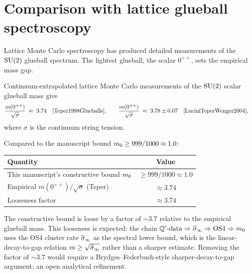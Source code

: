\section{Comparison with lattice glueball spectroscopy}
\label{sec:teper-comparison}

%

Lattice Monte Carlo spectroscopy has produced detailed measurements
of the $\SUtwo$ glueball spectrum.  The lightest glueball, the
scalar $0^{++}$, sets the empirical mass gap.

\begin{theorem}
\label{thm:teper-ratio}
Continuum-extrapolated lattice Monte Carlo measurements of the
$\SUtwo$ scalar glueball mass give
\begin{equation}
  \label{eq:teper-ratio}
  \frac{m(0^{++})}{\sqrt{\sigma}} \;\approx\; 3.74
  \quad \text{\cite{Teper1998Glueballs}},
  \qquad
  \frac{m(0^{++})}{\sqrt{\sigma}} \;\approx\; 3.78 \pm 0.07
  \quad \text{\cite{LuciniTeperWenger2004}} ,
\end{equation}
where $\sigma$ is the continuum string tension.
\end{theorem}

Compared to the manuscript bound $m_0 \ge 999/1000 \approx 1.0$:

\begin{infobox}[main][title=Bound versus empirical $\SUtwo$ mass]
\centering
\renewcommand{\arraystretch}{1.25}
\begin{tabular}{lc}
\toprule
Quantity                                         & Value     \\
\midrule
This manuscript's constructive bound $m_0$  & $\ge 999/1000 \approx 1.0$ \\
Empirical $m(0^{++}) / \sqrt{\sigma}$ (Teper)    & $\approx 3.74$ \\
Looseness factor                                 & $\approx 3.74$ \\
\bottomrule
\end{tabular}
\end{infobox}

The constructive bound is loose by a factor of $\sim 3.7$ relative
to the empirical glueball mass.  This looseness is expected: the
chain $\mathbb{Q}'\text{-data} \Rightarrow \widehat{\sigma}_\infty \Rightarrow \mathrm{OS4}
\Rightarrow m_0$ uses the OS4 cluster rate $\widehat{\sigma}_\infty$ as the
spectral lower bound, which is the linear-decay-to-gap relation
$m \ge \sqrt{\widehat{\sigma}_\infty}$ rather than a sharper estimate.  Removing
the factor of $\sim 3.7$ would require a Brydges--Federbush-style
sharper-decay-to-gap argument; an open analytical refinement.

